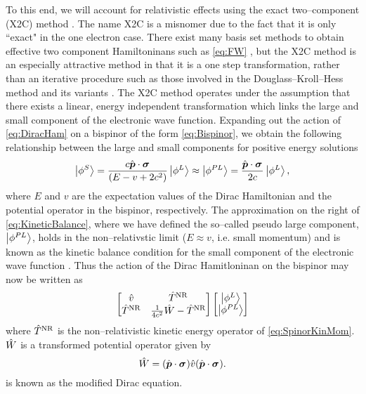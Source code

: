 To this end, we will account for relativistic effects using the exact two--component (X2C) method .
The name X2C is a misnomer due to the fact that it is only ``exact" in the one electron case. There
exist many basis set methods to obtain effective two component Hamiltoninans such as \cref{eq:FW} ,
but the X2C method is an especially attractive method in that it is a one step transformation, rather than
an iterative procedure such as those involved in the Douglass--Kroll--Hess method and its variants .
The X2C method operates under the assumption that there exists a linear, energy independent transformation which
links the large and small component of the electronic wave function. Expanding out the action of \cref{eq:DiracHam}
on a bispinor of the form \cref{eq:Bispinor}, we obtain the following relationship between the large and small components for positive energy 
solutions
\begin{equation}
  \label{eq:KineticBalance}
  \left\vert \phi^S \right\rangle = \frac{c \hat{\boldsymbol{p}} \cdot \boldsymbol{\sigma}_{}}{(E - v + 2c^2)} \left\vert \phi^L  \right\rangle \approx 
    \left\vert \phi^{PL}  \right\rangle = \frac{\hat{\boldsymbol{p}} \cdot \boldsymbol{\sigma}_{}}{2c} \left\vert \phi^L  \right\rangle,
\end{equation}
where $E$ and $v$ are the expectation values of the Dirac Hamiltonian and the potential operator in the bispinor, respectively.
The approximation on the right of \cref{eq:KineticBalance}, where we have defined the so--called pseudo large component, $\left\vert \phi^{PL} \right\rangle$,
holds in the non--relativstic limit ($E \approx v$, i.e. small momentum)
and is known as the kinetic balance condition for the small component of the electronic wave function . 
Thus the action of the Dirac Hamitloninan on the bispinor may now be written as
\begin{equation}
\label{eq:ModDirac}
\begin{bmatrix}
\hat{v} & \hat{T}^{\mathrm{NR}} \\ \hat{T}^{\mathrm{NR}} & \frac{1}{4c^2} \hat{W} - \hat{T}^{\mathrm{NR}}
\end{bmatrix}
\begin{bmatrix}
\left\vert \phi^L \right\rangle \\ \left\vert \phi^{PL} \right\rangle
\end{bmatrix}
\end{equation}
where $\hat{T}^{\mathrm{NR}}$ is the non--relativistic kinetic energy operator of \cref{eq:SpinorKinMom}. $\hat{W}$ is a transformed
potential operator given by
\begin{equation}
\hat{W} = (\hat{\boldsymbol{p}} \cdot \boldsymbol{\sigma}_{}) \hat{v} (\hat{\boldsymbol{p}} \cdot \boldsymbol{\sigma}_{}).
\end{equation}
 is known as the modified Dirac equation.

